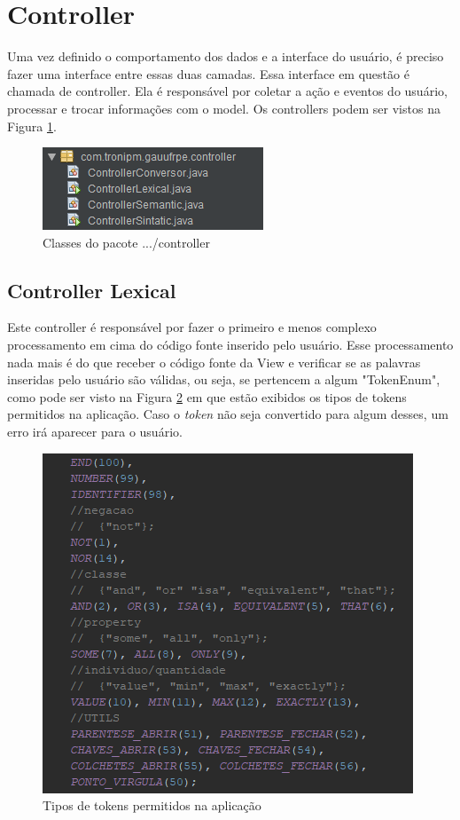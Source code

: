 \documentclass{bcc}
\begin{document}
\section{Controller}

Uma vez definido o comportamento dos dados e a interface do usuário, é preciso fazer uma interface entre essas duas camadas. Essa interface em questão é chamada de controller. Ela é responsável por coletar a ação e eventos do usuário, processar e trocar informações com o model. Os controllers podem ser vistos na Figura \ref{fig:pacotesController}.

\begin{figure}[H]
\centering
\includegraphics[width=.7\textwidth]{Figuras/pacote_controller.png}
\caption{Classes do pacote .../controller}
\label{fig:pacotesController}
\end{figure}

\subsection{Controller Lexical}

Este controller é responsável por fazer o primeiro e menos complexo processamento em cima do código fonte inserido pelo usuário. Esse processamento nada mais é do que receber o código fonte da View e verificar se as palavras inseridas pelo usuário são válidas, ou seja, se pertencem a algum "TokenEnum", como pode ser visto na Figura \ref{fig:codigoTokenenum} em que estão exibidos os tipos de tokens permitidos na aplicação. Caso o \textit{token} não seja convertido para algum desses, um erro irá aparecer para o usuário.

\begin{figure}[H]
\centering
\includegraphics[width=.7\textwidth]{Figuras/codigo_tokenenum.png}
\caption{Tipos de tokens permitidos na aplicação}
\label{fig:codigoTokenenum}
\end{figure}
\end{document}
